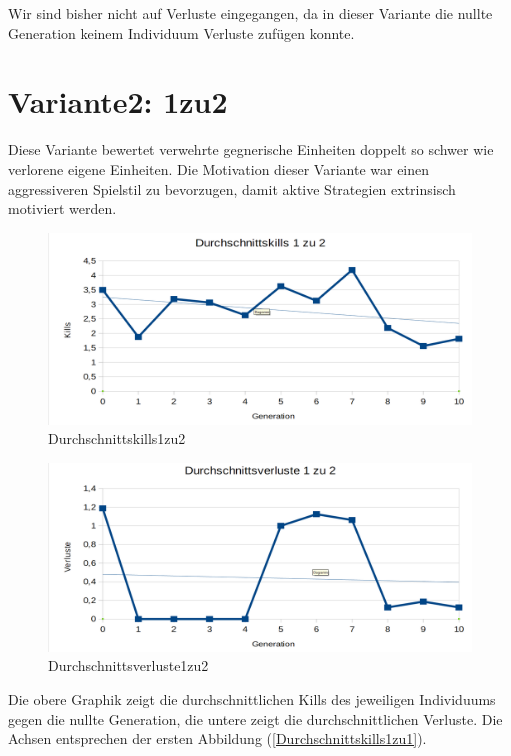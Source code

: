 \documentclass[
	12pt,
	a4paper,
	BCOR10mm,
	DIV14,
	headsepline,
	usegeometry,
]{scrreprt}
\begin{document}
Wir sind bisher nicht auf Verluste eingegangen, da in dieser Variante die nullte Generation keinem Individuum Verluste zufügen konnte.

\section{Variante2: 1zu2}
Diese Variante bewertet verwehrte gegnerische Einheiten doppelt so schwer wie verlorene eigene Einheiten.
Die Motivation dieser Variante war einen aggressiveren Spielstil zu bevorzugen, damit aktive Strategien extrinsisch motiviert werden.

\begin{figure}[h]
	\includegraphics[width = \textwidth]{Durchschnittskills1zu2.png}
	\caption{Durchschnittskills1zu2}
	\label{Durchschnittskills1zu2}
\end{figure}

\begin{figure}[h]
	\includegraphics[width = \textwidth]{Durchschnittsverluste1zu2.png}
	\caption{Durchschnittsverluste1zu2}
	\label{Durchschnittsverluste1zu2}
\end{figure}

Die obere Graphik zeigt die durchschnittlichen Kills des jeweiligen Individuums gegen die nullte Generation, die untere zeigt die durchschnittlichen Verluste.
Die Achsen entsprechen der ersten Abbildung (\ref{Durchschnittskills1zu1}).
\end{document}

